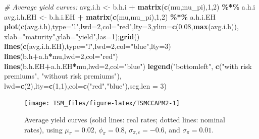 \documentclass[
  12pt,
]{book}
\newenvironment{Shaded}{\begin{snugshade}}{\end{snugshade}}
\newcommand{\AttributeTok}[1]{\textcolor[rgb]{0.13,0.29,0.53}{#1}}
\newcommand{\CommentTok}[1]{\textcolor[rgb]{0.56,0.35,0.01}{\textit{#1}}}
\newcommand{\DecValTok}[1]{\textcolor[rgb]{0.00,0.00,0.81}{#1}}
\newcommand{\FloatTok}[1]{\textcolor[rgb]{0.00,0.00,0.81}{#1}}
\newcommand{\FunctionTok}[1]{\textcolor[rgb]{0.13,0.29,0.53}{\textbf{#1}}}
\newcommand{\NormalTok}[1]{#1}
\newcommand{\OtherTok}[1]{\textcolor[rgb]{0.56,0.35,0.01}{#1}}
\newcommand{\SpecialCharTok}[1]{\textcolor[rgb]{0.81,0.36,0.00}{\textbf{#1}}}
\newcommand{\StringTok}[1]{\textcolor[rgb]{0.31,0.60,0.02}{#1}}
\theoremstyle{definition}
\theoremstyle{definition}
\theoremstyle{definition}
\theoremstyle{definition}
\theoremstyle{remark}
\begin{document}
\begin{Shaded}
\begin{Highlighting}[]
\CommentTok{\# Average yield curves:}
\NormalTok{avg.i.h    }\OtherTok{\textless{}{-}}\NormalTok{ b.h.i    }\SpecialCharTok{+} \FunctionTok{matrix}\NormalTok{(}\FunctionTok{c}\NormalTok{(mu,mu\_pi),}\DecValTok{1}\NormalTok{,}\DecValTok{2}\NormalTok{) }\SpecialCharTok{\%*\%}\NormalTok{ a.h.i}
\NormalTok{avg.i.h.EH }\OtherTok{\textless{}{-}}\NormalTok{ b.h.i.EH }\SpecialCharTok{+} \FunctionTok{matrix}\NormalTok{(}\FunctionTok{c}\NormalTok{(mu,mu\_pi),}\DecValTok{1}\NormalTok{,}\DecValTok{2}\NormalTok{) }\SpecialCharTok{\%*\%}\NormalTok{ a.h.i.EH}
\FunctionTok{plot}\NormalTok{(}\FunctionTok{c}\NormalTok{(avg.i.h),}\AttributeTok{type=}\StringTok{"l"}\NormalTok{,}\AttributeTok{lwd=}\DecValTok{2}\NormalTok{,}\AttributeTok{col=}\StringTok{"red"}\NormalTok{,}\AttributeTok{lty=}\DecValTok{3}\NormalTok{,}\AttributeTok{ylim=}\FunctionTok{c}\NormalTok{(}\FloatTok{0.08}\NormalTok{,}\FunctionTok{max}\NormalTok{(avg.i.h)),}
     \AttributeTok{xlab=}\StringTok{"maturity"}\NormalTok{,}\AttributeTok{ylab=}\StringTok{"yield"}\NormalTok{,}\AttributeTok{las=}\DecValTok{1}\NormalTok{);}\FunctionTok{grid}\NormalTok{()}
\FunctionTok{lines}\NormalTok{(}\FunctionTok{c}\NormalTok{(avg.i.h.EH),}\AttributeTok{type=}\StringTok{"l"}\NormalTok{,}\AttributeTok{lwd=}\DecValTok{2}\NormalTok{,}\AttributeTok{col=}\StringTok{"blue"}\NormalTok{,}\AttributeTok{lty=}\DecValTok{3}\NormalTok{)}
\FunctionTok{lines}\NormalTok{(b.h}\SpecialCharTok{+}\NormalTok{a.h}\SpecialCharTok{*}\NormalTok{mu,}\AttributeTok{lwd=}\DecValTok{2}\NormalTok{,}\AttributeTok{col=}\StringTok{"red"}\NormalTok{)}
\FunctionTok{lines}\NormalTok{(b.h.EH}\SpecialCharTok{+}\NormalTok{a.h.EH}\SpecialCharTok{*}\NormalTok{mu,}\AttributeTok{lwd=}\DecValTok{2}\NormalTok{,}\AttributeTok{col=}\StringTok{"blue"}\NormalTok{)}
\FunctionTok{legend}\NormalTok{(}\StringTok{"bottomleft"}\NormalTok{,}
       \FunctionTok{c}\NormalTok{(}\StringTok{"with risk premiums"}\NormalTok{,}
         \StringTok{"without risk premiums"}\NormalTok{),}
       \AttributeTok{lwd=}\FunctionTok{c}\NormalTok{(}\DecValTok{2}\NormalTok{),}\AttributeTok{lty=}\FunctionTok{c}\NormalTok{(}\DecValTok{1}\NormalTok{,}\DecValTok{1}\NormalTok{),}\AttributeTok{col=}\FunctionTok{c}\NormalTok{(}\StringTok{"red"}\NormalTok{,}\StringTok{"blue"}\NormalTok{),}\AttributeTok{seg.len =} \DecValTok{3}\NormalTok{)}
\end{Highlighting}
\end{Shaded}

\begin{figure}
\texttt{[image: TSM\_files/figure-latex/TSMCCAPM2-1]} \caption{Average yield curves (solid lines: real rates; dotted lines: nominal rates), using $\mu_\pi = 0.02$, $\phi_\pi=0.8$, $\sigma_{\pi,c}=-0.6$, and $\sigma_\pi=0.01$.}\label{fig:TSMCCAPM2}
\end{figure}
\end{document}
